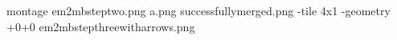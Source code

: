 montage em2mbsteptwo.png a.png successfullymerged.png -tile 4x1 -geometry +0+0 em2mbstepthreewitharrows.png
